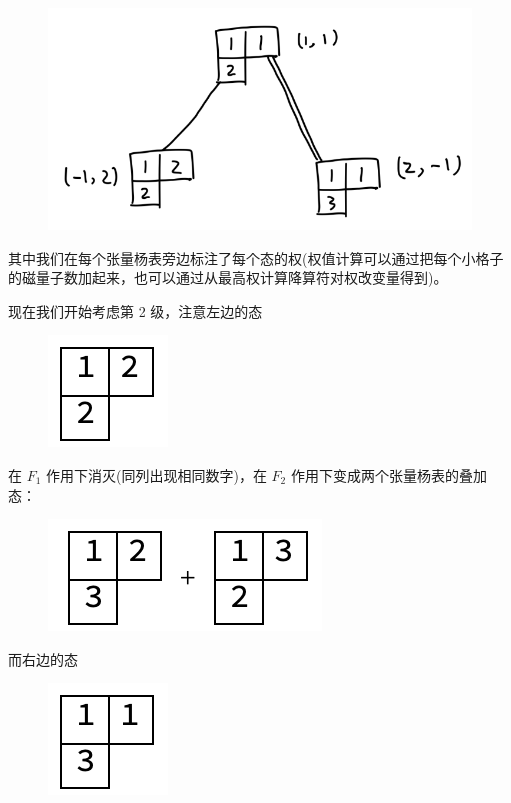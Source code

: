 \documentclass[UTF8]{ctexart}
\begin{document}
\begin{figure}[H]
\begin{centering}
\includegraphics[width=0.5\linewidth]{include/T1}
\par\end{centering}
\end{figure}

\noindent 其中我们在每个张量杨表旁边标注了每个态的权(权值计算可以通过把每个小格子的磁量子数加起来，也可以通过从最高权计算降算符对权改变量得到)。

现在我们开始考虑第 2 级，注意左边的态

\begin{figure}[H]
\begin{centering}
\includegraphics[width=0.1\linewidth]{include/Y4}
\par\end{centering}
\end{figure}

\noindent 在 $F_1$ 作用下消灭(同列出现相同数字)，在 $F_2$ 作用下变成两个张量杨表的叠加态：

\begin{figure}[H]
\begin{centering}
\includegraphics[width=0.25\linewidth]{include/Y5}
\par\end{centering}
\end{figure}

\noindent 而右边的态

\begin{figure}[H]
\begin{centering}
\includegraphics[width=0.1\linewidth]{include/Y6}
\par\end{centering}
\end{figure}
\end{document}

